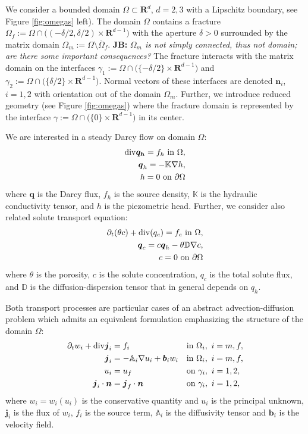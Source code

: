 \documentclass[a4paper]{article}
\def\prtl{\partial}
\def\vc#1{\mathbf{\boldsymbol{#1}}}     %
\def\tn#1{{\mathbb{#1}}}    %
\def\div{{\rm div}}
\def\grad{\nabla}
\def\Real{{\mathbf R}}
\newcommand{\note}[2]{{\color{blue} \textbf{ #1:} \textit{#2}}}
\begin{document}
We consider a bounded domain $\Omega \subset \Real^d$, $d=2,3$ with a Lipschitz boundary, see Figure \ref{fig:omegas} left). The domain $\Omega$ contains 
a fracture $\Omega_f:=\Omega\cap \big((-\delta/2,\delta/2)\times\Real^{d-1}\big)$ 
with the aperture $\delta>0$ surrounded by the matrix domain $\Omega_m:=\Omega\setminus\overline\Omega_f$. 
\note{JB}{$\Omega_m$ is not simply connected, thus not domain; are there some important consequences?}
The fracture interacts with the matrix domain on the interfaces 
$\gamma_1:=\Omega\cap\big( \{-\delta/2\}\times \Real^{d-1}\big)$ and 
$\gamma_2:=\Omega\cap\big( \{ \delta/2\}\times \Real^{d-1}\big)$. Normal vectors of these interfaces are denoted $\vc n_i$, $i=1,2$ with orientation out of the domain $\Omega_m$.
Further, we introduce reduced geometry (see Figure \ref{fig:omegas})
where the fracture domain is represented by the interface $\gamma:=\Omega\cap\big(\{0\}\times\Real^{d-1}\big)$ in its center. 

We are interested in a steady Darcy flow on domain $\Omega$:
\begin{align}
    \label{eq:darcy_flow}
    \div \vc{q_h} = f_h \mbox{ in }\Omega, \\
    \vc q_h = -\tn K \grad h, \\
    h=0\mbox{ on }\partial\Omega
\end{align}
where $\vc q$ is the Darcy flux, $f_h$ is the source density, $\tn K$ is the hydraulic conductivity tensor, and $h$ is the piezometric head.
Further, we consider also related solute transport equation:
\begin{align}
    \label{eq:solute_transport}
    \prtl_t (\theta c) + \div(q_c) = f_c \mbox{ in }\Omega,\\
    \vc q_c = c \vc q_h - \theta \tn D \grad c, \\
    c=0\mbox{ on }\partial\Omega
\end{align}
where $\theta$ is the porosity, $c$ is the solute concentration, $q_c$ is the total solute flux, and $\tn D$ is the diffusion-dispersion tensor that in general depends on $q_h$.

Both transport processes are particular cases of an abstract advection-diffusion problem which admits an equivalent formulation
emphasizing the structure of the domain $\Omega$:
\begin{align}
  \label{eq:full:continuity}
  \prtl_t w_i + \div \vc j_i &= f_i&&  \text{in } \Omega_i,\ i=m,f,\\
  \label{eq:full:flux}
  \vc j_i &= - \tn A_i\grad u_i + \vc b_i w_i&& \text{in } \Omega_i,\ i=m,f,\\
  \label{eq:full:Dirichlet}
  u_i &= u_f&& \text{on } \gamma_i,\ i=1,2,\\
  \label{eq:full:Neumann}
  \vc j_i \cdot \vc n &= \vc j_f \cdot \vc n&& \text{on } \gamma_i,\ i=1,2,
\end{align}
where $w_i=w_i(u_i)$ is the conservative quantity and $u_i$ is the principal unknown, $\vc j_i$ is the flux of $w_i$, $f_i$ is the source term,
$\tn A_i$ is the diffusivity tensor and $\vc b_i$ is the velocity field. 
\end{document}
